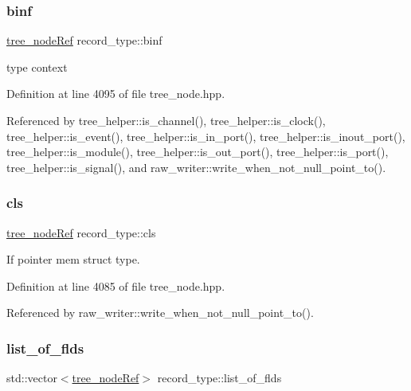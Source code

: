 \subsubsection{\texorpdfstring{binf}{binf}}
{\footnotesize\ttfamily \hyperlink{tree__node_8hpp_a6ee377554d1c4871ad66a337eaa67fd5}{tree\+\_\+node\+Ref} record\+\_\+type\+::binf}



type context 



Definition at line 4095 of file tree\+\_\+node.\+hpp.



Referenced by tree\+\_\+helper\+::is\+\_\+channel(), tree\+\_\+helper\+::is\+\_\+clock(), tree\+\_\+helper\+::is\+\_\+event(), tree\+\_\+helper\+::is\+\_\+in\+\_\+port(), tree\+\_\+helper\+::is\+\_\+inout\+\_\+port(), tree\+\_\+helper\+::is\+\_\+module(), tree\+\_\+helper\+::is\+\_\+out\+\_\+port(), tree\+\_\+helper\+::is\+\_\+port(), tree\+\_\+helper\+::is\+\_\+signal(), and raw\+\_\+writer\+::write\+\_\+when\+\_\+not\+\_\+null\+\_\+point\+\_\+to().

\mbox{\label{structrecord__type_a4696c955c3d62ed9ce6039d51df26607}} 
\subsubsection{\texorpdfstring{cls}{cls}}
{\footnotesize\ttfamily \hyperlink{tree__node_8hpp_a6ee377554d1c4871ad66a337eaa67fd5}{tree\+\_\+node\+Ref} record\+\_\+type\+::cls}



If pointer mem struct type. 



Definition at line 4085 of file tree\+\_\+node.\+hpp.



Referenced by raw\+\_\+writer\+::write\+\_\+when\+\_\+not\+\_\+null\+\_\+point\+\_\+to().

\mbox{\label{structrecord__type_a26cc99b173912cb9022befd516559fe2}} 
\subsubsection{\texorpdfstring{list\+\_\+of\+\_\+flds}{list\_of\_flds}}
{\footnotesize\ttfamily std\+::vector$<$\hyperlink{tree__node_8hpp_a6ee377554d1c4871ad66a337eaa67fd5}{tree\+\_\+node\+Ref}$>$ record\+\_\+type\+::list\+\_\+of\+\_\+flds}



